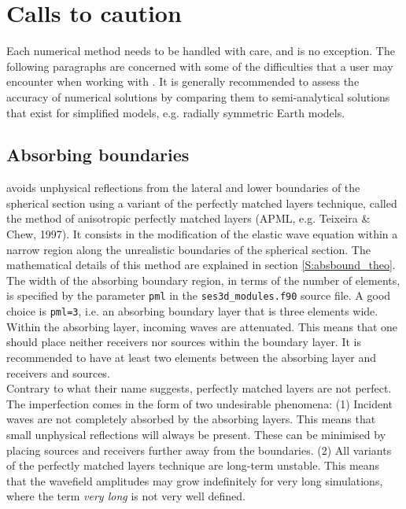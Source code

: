 \section{Calls to caution}\label{S:caution}

Each numerical method needs to be handled with care, and \SES is no exception. The following paragraphs are concerned with some of the difficulties that a user may encounter when working with \SES. It is generally recommended to assess the accuracy of numerical solutions by comparing them to semi-analytical solutions that exist for simplified models, e.g. radially symmetric Earth models.

\subsection{Absorbing boundaries}

\SES avoids unphysical reflections from the lateral and lower boundaries of the spherical section using a variant of the perfectly matched layers technique, called the method of anisotropic perfectly matched layers (APML, e.g. Teixeira \& Chew, 1997). It consists in the modification of the elastic wave equation within a narrow region along the unrealistic boundaries of the spherical section. The mathematical details of this method are explained in section \ref{S:absbound_theo}.\\[5pt]
The width of the absorbing boundary region, in terms of the number of elements, is specified by the parameter \texttt{pml} in the \texttt{ses3d\_modules.f90} source file. A good choice is \texttt{pml=3}, i.e. an absorbing boundary layer that is three elements wide.\\[5pt]
Within the absorbing layer, incoming waves are attenuated. This means that one should place neither receivers nor sources within the boundary layer. It is recommended to have at least two elements between the absorbing layer and receivers and sources.\\[5pt]
Contrary to what their name suggests, perfectly matched layers are not perfect. The imperfection comes in the form of two undesirable phenomena: (1) Incident waves are not completely absorbed by the absorbing layers. This means that small unphysical reflections will always be present. These can be minimised by placing sources and receivers further away from the boundaries. (2) All variants of the perfectly matched layers technique are long-term unstable. This means that the wavefield amplitudes may grow indefinitely for very long simulations, where the term \emph{very long} is not very well defined. 

